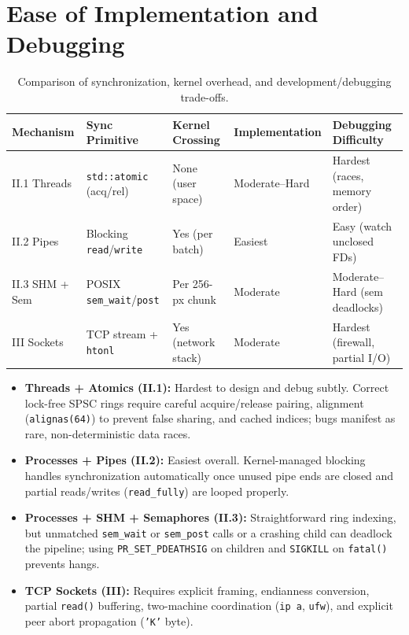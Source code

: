 \documentclass[10pt,a4paper]{article}
\begin{document}
\section{Ease of Implementation and Debugging}

\begin{table}[h!]
\centering
\small
\begin{tabular}{@{}lllll@{}}
\toprule
Mechanism & Sync Primitive & Kernel Crossing & Implementation & Debugging Difficulty \\
\midrule
II.1 Threads & \texttt{std::atomic} (acq/rel) & None (user space) & Moderate--Hard & Hardest (races, memory order) \\
II.2 Pipes & Blocking \texttt{read}/\texttt{write} & Yes (per batch) & Easiest & Easy (watch unclosed FDs) \\
II.3 SHM + Sem & POSIX \texttt{sem\_wait}/\texttt{post} & Per 256-px chunk & Moderate & Moderate--Hard (sem deadlocks) \\
III Sockets & TCP stream + \texttt{htonl} & Yes (network stack) & Moderate & Hardest (firewall, partial I/O) \\
\bottomrule
\end{tabular}
\caption{Comparison of synchronization, kernel overhead, and development/debugging trade-offs.}
\label{tab:ease}
\end{table}

\begin{itemize}
    \item \textbf{Threads + Atomics (II.1):} Hardest to design and debug subtly. Correct lock-free SPSC rings require careful acquire/release pairing, alignment (\texttt{alignas(64)}) to prevent false sharing, and cached indices; bugs manifest as rare, non-deterministic data races.
    \item \textbf{Processes + Pipes (II.2):} Easiest overall. Kernel-managed blocking handles synchronization automatically once unused pipe ends are closed and partial reads/writes (\texttt{read\_fully}) are looped properly.
    \item \textbf{Processes + SHM + Semaphores (II.3):} Straightforward ring indexing, but unmatched \texttt{sem\_wait} or \texttt{sem\_post} calls or a crashing child can deadlock the pipeline; using \texttt{PR\_SET\_PDEATHSIG} on children and \texttt{SIGKILL} on \texttt{fatal()} prevents hangs.
    \item \textbf{TCP Sockets (III):} Requires explicit framing, endianness conversion, partial \texttt{read()} buffering, two-machine coordination (\texttt{ip a}, \texttt{ufw}), and explicit peer abort propagation (\texttt{'K'} byte).
\end{itemize}
\end{document}
